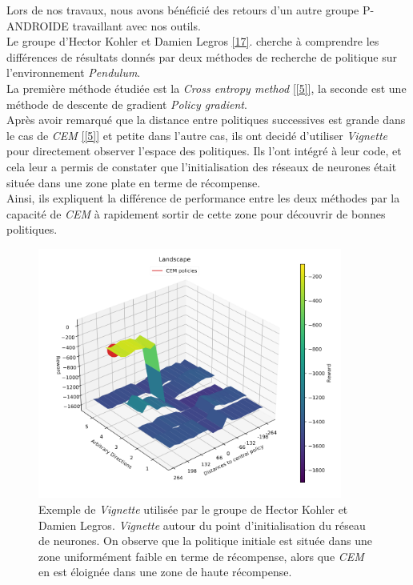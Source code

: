 \documentclass[12pt]{article}
\begin{document}
Lors de nos travaux, nous avons bénéficié des retours d'un autre groupe P-ANDROIDE travaillant avec nos outils. \\

Le groupe d'Hector Kohler et Damien Legros \href{https://github.com/KohlerHECTOR/PANDROIDE}{[17]}. cherche à comprendre les différences de résultats donnés par deux méthodes de recherche de politique sur l'environnement \emph{Pendulum}. \\

La première méthode étudiée est la \emph{Cross entropy method} \ref{[5]}, la seconde est une méthode de descente de gradient \emph{Policy gradient}. \\

Après avoir remarqué que la distance entre politiques successives est grande dans le cas de \emph{CEM} \ref{[5]} et petite dans l'autre cas, ils ont decidé d'utiliser \emph{Vignette} pour directement observer l'espace des politiques. Ils l'ont intégré à leur code, et cela leur a permis de constater que l'initialisation des réseaux de neurones était située dans une zone plate en terme de récompense. \\

Ainsi, ils expliquent la différence de performance entre les deux méthodes par la capacité de \emph{CEM} à rapidement sortir de cette zone pour découvrir de bonnes politiques. \\

\begin{figure}[htp]
    \centering
    \includegraphics[width=10cm]{Images/cem_example}
    \caption{Exemple de \emph{Vignette} utilisée par le groupe de Hector Kohler et Damien Legros. \emph{Vignette} autour du point d'initialisation du réseau de neurones. On observe que la politique initiale est située dans une zone uniformément faible en terme de récompense, alors que \emph{CEM} en est éloignée dans une zone de haute récompense.}
    \label{fig:cemExample}
\end{figure}
\end{document}
